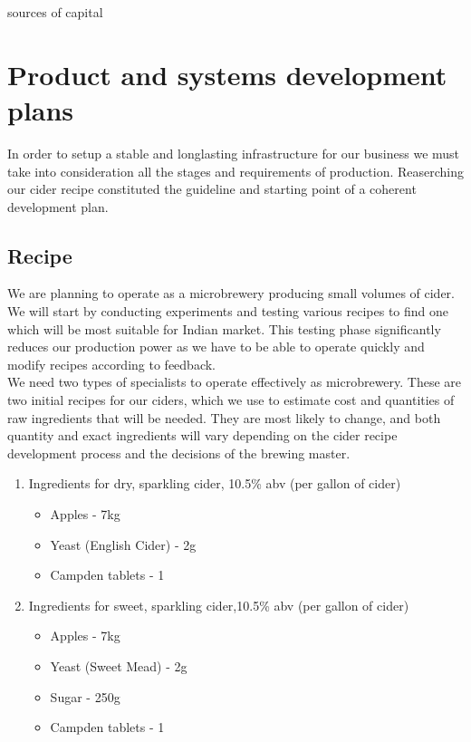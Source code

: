 \documentclass{article}
\begin{document}
sources of capital

\section{Product and systems development plans}
In order to setup a stable and longlasting infrastructure for our business we must take into consideration all the stages and requirements of production. Reaserching our cider recipe constituted the guideline and starting point of a coherent development plan. 

  \subsection{Recipe}
We are planning to operate as a microbrewery producing small volumes of cider. We will start by conducting experiments and testing various recipes to find one which will be most suitable for Indian market. This testing phase significantly reduces our production power as we have to be able to operate quickly and modify recipes according to feedback.\\

We need two types of specialists to operate effectively as microbrewery. These are two initial recipes for our ciders, which we use to estimate cost and quantities of raw ingredients that will be needed. They are most likely to change, and both quantity and exact ingredients will vary depending on the cider recipe development process and the decisions of the brewing master.

		\begin{enumerate}
			\item Ingredients for dry, sparkling cider, 10.5\% abv (per gallon of cider) \\
				\begin{itemize}
					\item Apples - 7kg \\
					\item Yeast (English Cider) - 2g \\
					\item Campden tablets - 1 \\
				\end{itemize}

			\item Ingredients for sweet, sparkling cider,10.5\% abv (per gallon of cider) \\
				\begin{itemize}
					\item Apples - 7kg \\
					\item Yeast (Sweet Mead) - 2g \\
					\item Sugar - 250g \\
					\item Campden tablets - 1 \\
				\end{itemize}
			\end{enumerate}
\end{document}
